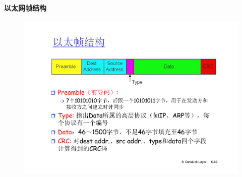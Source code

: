 \documentclass[]{report}
\begin{document}
			\paragraph{以太网帧结构}
			\begin{figure}[h]
				\centering
				\begin{minipage}{40em}
					\centering
					\includegraphics[scale = 0.4]{images/ethernet_frame.pdf}
				\end{minipage}
			\end{figure}
\end{document}
